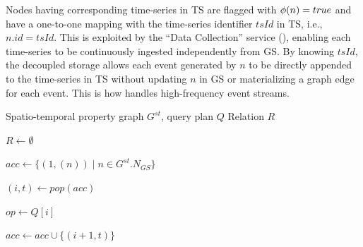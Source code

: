 Nodes having corresponding time-series in TS are flagged with $\phi(n) = true$ and have a one-to-one mapping with the time-series identifier $tsId$ in TS, i.e., $n.id = tsId$.
This is exploited by the ``Data Collection'' service (), enabling each time-series to be continuously ingested independently from GS.
By knowing $tsId$, the decoupled storage allows each event generated by $n$ to be directly appended to the time-series in TS without updating $n$ in GS or materializing a graph edge for each event.
This is how \ourapproach handles high-frequency event streams.
\begin{algorithm}[htp]
\scriptsize
\caption{``Query Service''}
\label{alg:search}
\begin{algorithmic}[1]

\Require Spatio-temporal property graph $G^{st}$, query plan $Q$
\Ensure Relation $R$

\State $R \gets \emptyset$
\label{alg:search:init-result}

\State $acc \gets \{(1,(n)) \mid n \in G^{st}.N_{GS}\}$
\label{alg:search:init-acc}

\label{alg:search:while}

    \State $(i,t) \gets pop(acc)$
    \label{alg:search:pop}

    \item[]

    \State $op \gets Q[i]$
    \label{alg:search:get-op}


        \Case{$\sigma_\theta$}
        \label{alg:search:selection-case}
            \label{alg:search:selection-test}
                \State $acc \gets acc \cup \{(i+1,t)\}$
                \label{alg:search:selection}
            \EndIf
        \EndCase
        
        \label{alg:search:expand-case}

            \label{alg:search:expand-loop}


\end{algorithmic}
\end{algorithm}
